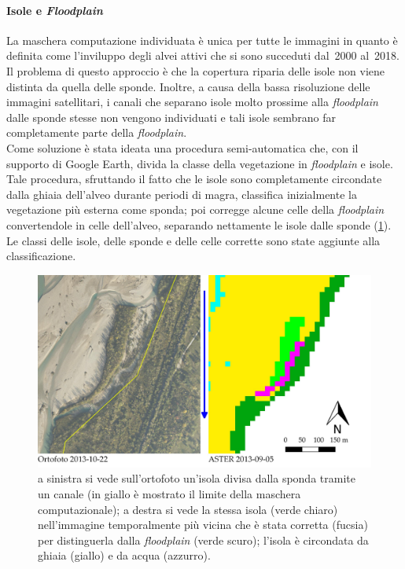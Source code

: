 \paragraph{Isole e \emph{Floodplain}}
La maschera computazione individuata è unica per tutte le immagini in quanto è definita come l'inviluppo degli alvei attivi che si sono succeduti dal~2000 al~2018.
Il problema di questo approccio è che la copertura riparia delle isole non viene distinta da quella delle sponde.
Inoltre, a causa della bassa risoluzione delle immagini satellitari, i canali che separano isole molto prossime alla \emph{floodplain} dalle sponde stesse non vengono individuati e tali isole sembrano far completamente parte della \emph{floodplain}.
\\ 
Come soluzione è stata ideata una procedura semi-automatica che, con il supporto di Google Earth, divida la classe della vegetazione in \emph{floodplain} e isole. 
Tale procedura, sfruttando il fatto che le isole sono completamente circondate dalla ghiaia dell'alveo durante periodi di magra, classifica inizialmente la vegetazione più esterna come sponda;
poi corregge alcune celle della \emph{floodplain} convertendole in celle dell'alveo, separando nettamente le isole dalle sponde (\cref{fig:isola-divisa-floodplain}).
Le classi delle isole, delle sponde e delle celle corrette sono state aggiunte alla classificazione.
%
\begin{figure}
	\centering
	\includegraphics[width = \textwidth]{files/isola_divisa_floodplain.jpeg}
	\caption[esempio di correzione per dividere un'isola dalla sponda]{a sinistra si vede sull'ortofoto un'isola divisa dalla sponda tramite un canale (in giallo è mostrato il limite della maschera computazionale); a destra si vede la stessa isola (verde chiaro) nell'immagine \AST{} temporalmente più vicina che è stata corretta (fucsia) per distinguerla dalla \emph{floodplain} (verde scuro); l'isola è circondata da ghiaia (giallo) e da acqua (azzurro).}
	\label{fig:isola-divisa-floodplain}
\end{figure}
%
%
%
